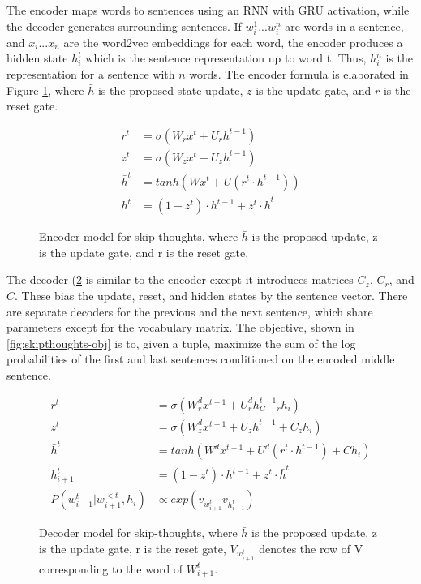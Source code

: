 The encoder maps words to sentences using an RNN with GRU activation, while the decoder generates surrounding sentences. If $w_i^1...w_i^n$ are words in a sentence, and $x_i...x_n$ are the word2vec embeddings for each word, the encoder produces a hidden state $h_i^t$ which is the sentence representation up to word t. Thus, $h_i^n$ is the representation for a sentence with $n$ words. The encoder formula is elaborated in Figure \ref{fig:skipthoughts-encoder}, where $\bar h$ is the proposed state update, $z$ is the update gate, and $r$ is the reset gate. 

\begin{figure}[h!]
    \centering
    \begin{align*}
    r^t &= \sigma(W_rx^t + U_r h^{t-1}) \\
    z^t &= \sigma (W_z x^t + U_z h^{t-1}) \\
    \bar h^t &= tanh(Wx^t + U(r^t \cdot h^{t-1})) \\
    h^t &= (1 - z^t) \cdot h^{t-1} + z^t \cdot \bar h ^t
    \end{align*}
    \caption{Encoder model for skip-thoughts, where $\bar h$ is the proposed update, z is the update gate, and r is the reset gate.}
    \label{fig:skipthoughts-encoder}
\end{figure}

The decoder (\ref{fig:skipthoughts-decoder} is similar to the encoder except it introduces matrices $C_z$, $C_r$, and $C$. These bias the update, reset, and hidden states by the sentence vector. There are separate decoders for the previous and the next sentence, which share parameters except for the vocabulary matrix. The objective, shown in \ref{fig:skipthoughts-obj} is to, given a tuple, maximize the sum of the log probabilities of the first and last sentences conditioned on the encoded middle sentence. 

\begin{figure}[h!]
    \centering
    \begin{align*}
    r^t &= \sigma(W_r^d x^{t-1} + U_r^d h^{t-1} _  C_r h_i) \\
    z^t &= \sigma (W_z^d x^{t-1} + U_z h^{t-1} + C_z h_i) \\
    \bar h^t &= tanh(W^d x^{t-1} + U^d(r^t \cdot h^{t-1}) + C h_i) \\
    h^t_{i+1} &= (1 - z^t) \cdot h^{t-1} + z^t \cdot \bar h ^t \\
    P(w^t_{i+1}|w^{<t}_{i+1}, h_i) &\propto exp(v_{w^t_{i+1}}v_{h^t_{i+1}})
    \end{align*}
    \caption{Decoder model for skip-thoughts, where $\bar h$ is the proposed update, z is the update gate, r is the reset gate, $V_{w^t_{i+1}}$ denotes the row of V corresponding to the word of $W^t_{i+1}$.}
    \label{fig:skipthoughts-decoder}
\end{figure}

